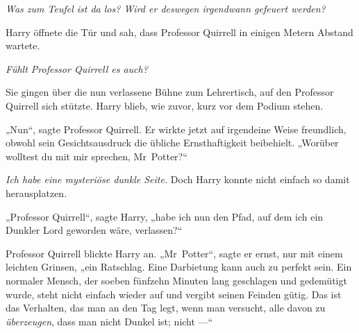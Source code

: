 \emph{Was zum Teufel ist da los? Wird er deswegen irgendwann gefeuert werden?}

Harry öffnete die Tür und sah, dass Professor Quirrell in einigen Metern Abstand wartete.

\emph{Fühlt Professor Quirrell es auch?}

Sie gingen über die nun verlassene Bühne zum Lehrertisch, auf den Professor Quirrell sich stützte. Harry blieb, wie zuvor, kurz vor dem Podium stehen.

„Nun“, sagte Professor Quirrell. Er wirkte jetzt auf irgendeine Weise freundlich, obwohl sein Gesichtsausdruck die übliche Ernsthaftigkeit beibehielt.
„Worüber wolltest du mit mir sprechen, Mr~Potter?“

\emph{Ich habe eine mysteriöse dunkle Seite.} Doch Harry konnte nicht einfach so damit herausplatzen.

„Professor Quirrell“, sagte Harry, „habe ich nun den Pfad, auf dem ich ein Dunkler Lord geworden wäre, verlassen?“

Professor Quirrell blickte Harry an.
„Mr~Potter“, sagte er ernst, nur mit einem leichten Grinsen, „ein Ratschlag. Eine Darbietung kann auch zu perfekt sein. Ein normaler Mensch, der soeben fünfzehn Minuten lang geschlagen und gedemütigt wurde, steht nicht einfach wieder auf und vergibt seinen Feinden gütig. Das ist das Verhalten, das man an den Tag legt, wenn man versucht, alle davon zu \emph{überzeugen}, dass man nicht Dunkel ist; nicht —“

